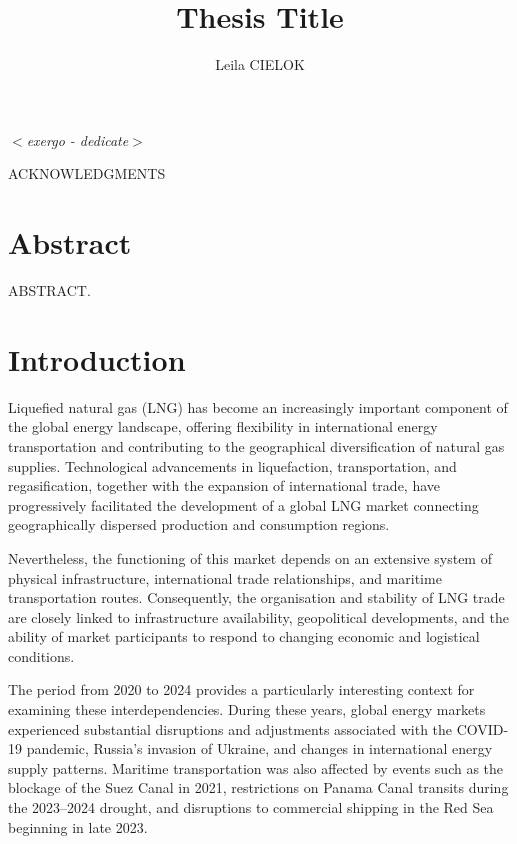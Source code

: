 \documentclass[pdftex,12pt,openright,a4paper,oneside]{book}
\newcommand\blankpage{%
    \null
    \thispagestyle{empty}%
    \addtocounter{page}{-1}%
    \newpage}
\newcommand {\dedicate}[1]{
        \newpage
        \begin{flushright}\large\em\null\vskip1in
        #1
        \vfill\end{flushright}
}
\begin{document}
\normalbaselineskip

\pagestyle{empty}


\title{Thesis Title}
\author{Leila CIELOK}

% 
%
\beforepreface
\dedicate{$<$exergo - dedicate$>$}

%
%
ACKNOWLEDGMENTS

\afterpreface

\chapter*{Abstract}
\label{chap:abstract}
ABSTRACT.
% 
% 
\chapter{Introduction}
\label{chap:introduction}
Liquefied natural gas (LNG) has become an increasingly important component of the global energy landscape, offering flexibility in international energy transportation and contributing to the geographical diversification of natural gas supplies. Technological advancements in liquefaction, transportation, and regasification, together with the expansion of international trade, have progressively facilitated the development of a global LNG market connecting geographically dispersed production and consumption regions.

Nevertheless, the functioning of this market depends on an extensive system of physical infrastructure, international trade relationships, and maritime transportation routes. Consequently, the organisation and stability of LNG trade are closely linked to infrastructure availability, geopolitical developments, and the ability of market participants to respond to changing economic and logistical conditions.

The period from 2020 to 2024 provides a particularly interesting context for examining these interdependencies. During these years, global energy markets experienced substantial disruptions and adjustments associated with the COVID-19 pandemic, Russia's invasion of Ukraine, and changes in international energy supply patterns. Maritime transportation was also affected by events such as the blockage of the Suez Canal in 2021, restrictions on Panama Canal transits during the 2023–2024 drought, and disruptions to commercial shipping in the Red Sea beginning in late 2023.
\end{document}
